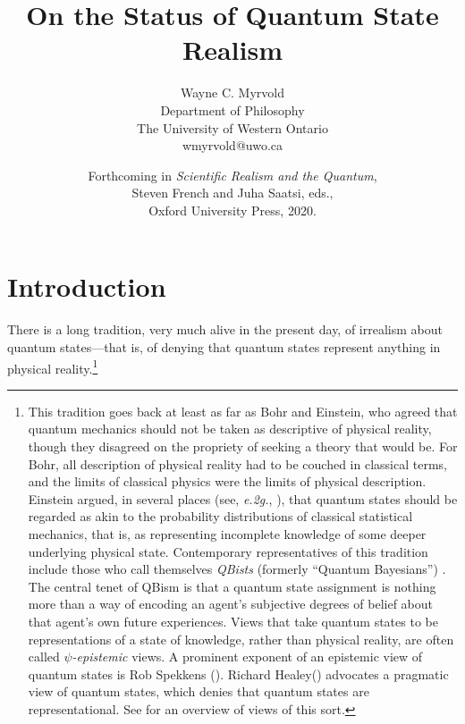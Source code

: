 \documentclass[12pt]{article}
\title{On the Status of Quantum State Realism}
\author{Wayne C. Myrvold \\
 Department of Philosophy \\
 The University of Western Ontario \\
 wmyrvold@uwo.ca}
\date{Forthcoming in \emph{Scientific Realism and the Quantum}, \\ Steven French and Juha Saatsi, eds., \\ Oxford University Press, 2020.}
\begin{document}
 \maketitle



\section{Introduction}  There is a long tradition, very much alive in the present day, of irrealism  about quantum states---that is, of denying that quantum states represent anything in physical reality.\footnote{This tradition goes back at least as far as Bohr and Einstein, who  agreed that quantum mechanics should not be taken as descriptive of physical reality, though they disagreed on the propriety of  seeking a theory that would be.  For Bohr, all description of physical reality had to be couched in classical terms, and the limits of classical physics were the limits of physical description.  Einstein argued, in several places (see, \emph{e.2g.}, \citealt{EinsteinPR}), that quantum states should be regarded as akin to the probability distributions of classical statistical mechanics, that is, as representing incomplete knowledge of some deeper underlying physical state.    Contemporary representatives of this tradition include those who call themselves \emph{QBists} (formerly ``Quantum Bayesians'') \citep{CFSQB,FMSQB,FSQB}.  The central tenet of QBism is that a quantum state assignment is nothing more than a way of encoding an agent's  subjective degrees of belief about that agent's own future experiences.  Views that take quantum states to be representations of a state of knowledge, rather than physical reality, are often called \emph{$\psi$-epistemic} views.  A prominent exponent of an epistemic view of quantum states is Rob Spekkens (\citeyear{SpekkensToy,SpekkensPsiOnt}). Richard  Healey(\citeyear{HealeyPragQM,HealeyBridges,HealeyRevolution,HealeyPQR}) advocates a pragmatic view of quantum states, which denies that quantum states are representational.  See \citet{sep-quantum-bayesian} for an overview of views of this sort.}
\end{document}
